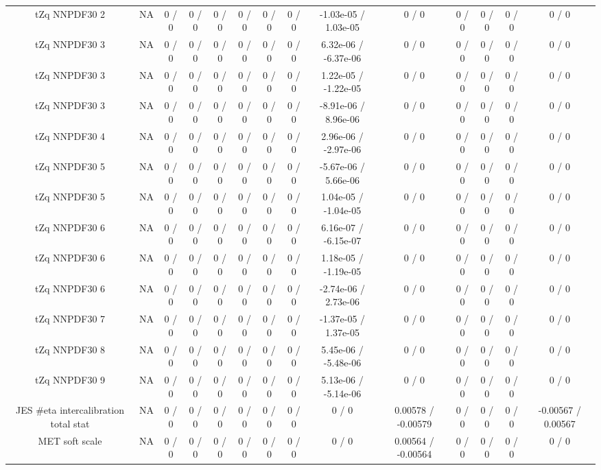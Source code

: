 \documentclass[10pt]{article}
\begin{document}
\begin{table}[htbp]
\begin{center}
\begin{tabular}{|c|c|c|c|c|c|c|c|c|c|c|c|c|c|}
  tZq NNPDF30 2 &    NA    & 0 / 0 & 0 / 0 & 0 / 0 & 0 / 0 & 0 / 0 & 0 / 0 & -1.03e-05 / 1.03e-05 & 0 / 0 & 0 / 0 & 0 / 0 & 0 / 0 & 0 / 0 \\ 
  tZq NNPDF30 3 &    NA    & 0 / 0 & 0 / 0 & 0 / 0 & 0 / 0 & 0 / 0 & 0 / 0 & 6.32e-06 / -6.37e-06 & 0 / 0 & 0 / 0 & 0 / 0 & 0 / 0 & 0 / 0 \\ 
  tZq NNPDF30 3 &    NA    & 0 / 0 & 0 / 0 & 0 / 0 & 0 / 0 & 0 / 0 & 0 / 0 & 1.22e-05 / -1.22e-05 & 0 / 0 & 0 / 0 & 0 / 0 & 0 / 0 & 0 / 0 \\ 
  tZq NNPDF30 3 &    NA    & 0 / 0 & 0 / 0 & 0 / 0 & 0 / 0 & 0 / 0 & 0 / 0 & -8.91e-06 / 8.96e-06 & 0 / 0 & 0 / 0 & 0 / 0 & 0 / 0 & 0 / 0 \\ 
  tZq NNPDF30 4 &    NA    & 0 / 0 & 0 / 0 & 0 / 0 & 0 / 0 & 0 / 0 & 0 / 0 & 2.96e-06 / -2.97e-06 & 0 / 0 & 0 / 0 & 0 / 0 & 0 / 0 & 0 / 0 \\ 
  tZq NNPDF30 5 &    NA    & 0 / 0 & 0 / 0 & 0 / 0 & 0 / 0 & 0 / 0 & 0 / 0 & -5.67e-06 / 5.66e-06 & 0 / 0 & 0 / 0 & 0 / 0 & 0 / 0 & 0 / 0 \\ 
  tZq NNPDF30 5 &    NA    & 0 / 0 & 0 / 0 & 0 / 0 & 0 / 0 & 0 / 0 & 0 / 0 & 1.04e-05 / -1.04e-05 & 0 / 0 & 0 / 0 & 0 / 0 & 0 / 0 & 0 / 0 \\ 
  tZq NNPDF30 6 &    NA    & 0 / 0 & 0 / 0 & 0 / 0 & 0 / 0 & 0 / 0 & 0 / 0 & 6.16e-07 / -6.15e-07 & 0 / 0 & 0 / 0 & 0 / 0 & 0 / 0 & 0 / 0 \\ 
  tZq NNPDF30 6 &    NA    & 0 / 0 & 0 / 0 & 0 / 0 & 0 / 0 & 0 / 0 & 0 / 0 & 1.18e-05 / -1.19e-05 & 0 / 0 & 0 / 0 & 0 / 0 & 0 / 0 & 0 / 0 \\ 
  tZq NNPDF30 6 &    NA    & 0 / 0 & 0 / 0 & 0 / 0 & 0 / 0 & 0 / 0 & 0 / 0 & -2.74e-06 / 2.73e-06 & 0 / 0 & 0 / 0 & 0 / 0 & 0 / 0 & 0 / 0 \\ 
  tZq NNPDF30 7 &    NA    & 0 / 0 & 0 / 0 & 0 / 0 & 0 / 0 & 0 / 0 & 0 / 0 & -1.37e-05 / 1.37e-05 & 0 / 0 & 0 / 0 & 0 / 0 & 0 / 0 & 0 / 0 \\ 
  tZq NNPDF30 8 &    NA    & 0 / 0 & 0 / 0 & 0 / 0 & 0 / 0 & 0 / 0 & 0 / 0 & 5.45e-06 / -5.48e-06 & 0 / 0 & 0 / 0 & 0 / 0 & 0 / 0 & 0 / 0 \\ 
  tZq NNPDF30 9 &    NA    & 0 / 0 & 0 / 0 & 0 / 0 & 0 / 0 & 0 / 0 & 0 / 0 & 5.13e-06 / -5.14e-06 & 0 / 0 & 0 / 0 & 0 / 0 & 0 / 0 & 0 / 0 \\ 
  JES #eta intercalibration total stat &    NA    & 0 / 0 & 0 / 0 & 0 / 0 & 0 / 0 & 0 / 0 & 0 / 0 & 0 / 0 & 0.00578 / -0.00579 & 0 / 0 & 0 / 0 & 0 / 0 & -0.00567 / 0.00567 \\ 
  MET soft scale &    NA    & 0 / 0 & 0 / 0 & 0 / 0 & 0 / 0 & 0 / 0 & 0 / 0 & 0 / 0 & 0.00564 / -0.00564 & 0 / 0 & 0 / 0 & 0 / 0 & 0 / 0 \\ 

\end{tabular}
\end{center}
\end{table}
\end{document}
